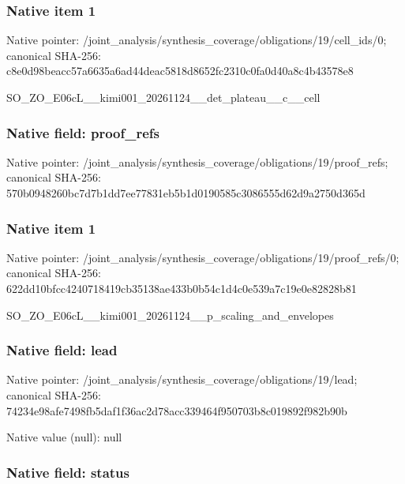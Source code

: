 \documentclass[10pt,a4paper]{article}
\begin{document}
\subsubsection{Native item 1}


Native pointer: /joint\_analysis/synthesi\allowbreak{}s\_coverage/obligations/1\allowbreak{}9/cell\_ids/0; canonical SHA-256: c8e0d98beacc57a6635a6ad4\allowbreak{}4deac5818d8652fc2310c0fa\allowbreak{}0d40a8c4b43578e8


SO\_ZO\_E06cL\_\_kimi001\_202\allowbreak{}61124\_\_det\_plateau\_\_c\_\_c\allowbreak{}ell


\subsubsection{Native field: proof\_refs}


Native pointer: /joint\_analysis/synthesi\allowbreak{}s\_coverage/obligations/1\allowbreak{}9/proof\_refs; canonical SHA-256: 570b0948260bc7d7b1dd7ee7\allowbreak{}7831eb5b1d0190585c308655\allowbreak{}5d62d9a2750d365d



\subsubsection{Native item 1}


Native pointer: /joint\_analysis/synthesi\allowbreak{}s\_coverage/obligations/1\allowbreak{}9/proof\_refs/0; canonical SHA-256: 622dd10bfcc4240718419cb3\allowbreak{}5138ae433b0b54c1d4c0e539\allowbreak{}a7c19e0e82828b81


SO\_ZO\_E06cL\_\_kimi001\_202\allowbreak{}61124\_\_p\_scaling\_and\_env\allowbreak{}elopes


\subsubsection{Native field: lead}


Native pointer: /joint\_analysis/synthesi\allowbreak{}s\_coverage/obligations/1\allowbreak{}9/lead; canonical SHA-256: 74234e98afe7498fb5daf1f3\allowbreak{}6ac2d78acc339464f950703b\allowbreak{}8c019892f982b90b



Native value (null): null



\subsubsection{Native field: status}
\end{document}
